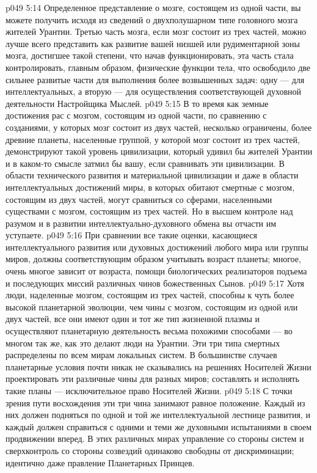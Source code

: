 \vs p049 5:14 Определенное представление о мозге, состоящем из одной части, вы можете получить исходя из сведений о двухполушарном типе головного мозга жителей Урантии. Третью часть мозга, если мозг состоит из трех частей, можно лучше всего представить как развитие вашей низшей или рудиментарной зоны мозга, достигшее такой степени, что начав функционировать, эта часть стала контролировать, главным образом, физические функции тела, что освободило две сильнее развитые части для выполнения более возвышенных задач: одну --- для интеллектуальных, а вторую --- для осуществления соответствующей духовной деятельности Настройщика Мыслей.
\vs p049 5:15 В то время как земные достижения рас с мозгом, состоящим из одной части, по сравнению с созданиями, у которых мозг состоит из двух частей, несколько ограничены, более древние планеты, населенные группой, у которой мозг состоит из трех частей, демонстрируют такой уровень цивилизации, который удивил бы жителей Урантии и в каком\hyp{}то смысле затмил бы вашу, если сравнивать эти цивилизации. В области технического развития и материальной цивилизации и даже в области интеллектуальных достижений миры, в которых обитают смертные с мозгом, состоящим из двух частей, могут сравниться со сферами, населенными существами с мозгом, состоящим из трех частей. Но в высшем контроле над разумом и в развитии интеллектуально\hyp{}духовного обмена вы отчасти им уступаете.
\vs p049 5:16 При сравнении все такие оценки, касающиеся интеллектуального развития или духовных достижений любого мира или группы миров, должны соответствующим образом учитывать возраст планеты; многое, очень многое зависит от возраста, помощи биологических реализаторов подъема и последующих миссий различных чинов божественных Сынов.
\vs p049 5:17 Хотя люди, наделенные мозгом, состоящим из трех частей, способны к чуть более высокой планетарной эволюции, чем чины с мозгом, состоящим из одной или двух частей, все они имеют один и тот же тип жизненной плазмы и осуществляют планетарную деятельность весьма похожими способами --- во многом так же, как это делают люди на Урантии. Эти три типа смертных распределены по всем мирам локальных систем. В большинстве случаев планетарные условия почти никак не сказывались на решениях Носителей Жизни проектировать эти различные чины для разных миров; составлять и исполнять такие планы --- исключительное право Носителей Жизни.
\vs p049 5:18 С точки зрения пути восхождения эти три чина занимают равное положение. Каждый из них должен подняться по одной и той же интеллектуальной лестнице развития, и каждый должен справиться с одними и теми же духовными испытаниями в своем продвижении вперед. В этих различных мирах управление со стороны систем и сверхконтроль со стороны созвездий одинаково свободны от дискриминации; идентично даже правление Планетарных Принцев.
